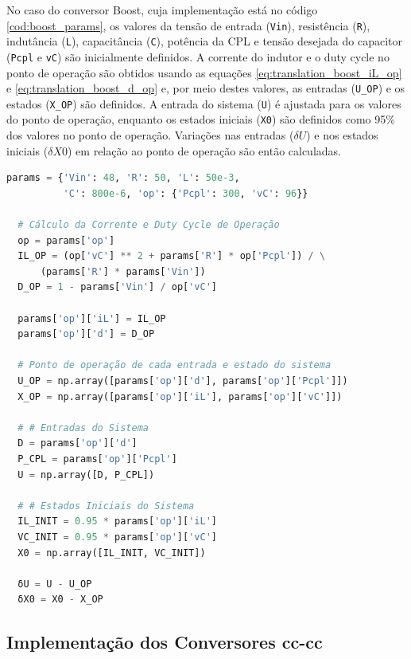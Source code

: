 No caso do conversor Boost, cuja implementação está no código \ref{cod:boost_params}, os valores da tensão de entrada (\texttt{Vin}), resistência (\texttt{R}), indutância (\texttt{L}), capacitância (\texttt{C}), potência da CPL e tensão desejada do capacitor (\texttt{Pcpl} e \texttt{vC}) são inicialmente definidos. A corrente do indutor e o duty cycle no ponto de operação são obtidos usando as equações \eqref{eq:translation_boost_iL_op} e \eqref{eq:translation_boost_d_op} e, por meio destes valores, as entradas (\texttt{U\_OP}) e os estados (\texttt{X\_OP}) são definidos. A entrada do sistema (\texttt{U}) é ajustada para os valores do ponto de operação, enquanto os estados iniciais (\texttt{X0}) são definidos como 95\% dos valores no ponto de operação. Variações nas entradas (\(\delta U\)) e nos estados iniciais ($\delta X0$) em relação ao ponto de operação são então calculadas.
\vspace{8pt}
\begin{lstlisting}[language=Python, caption={Parâmetros do conversor Boost.}, label=cod:boost_params]
  params = {'Vin': 48, 'R': 50, 'L': 50e-3,
          'C': 800e-6, 'op': {'Pcpl': 300, 'vC': 96}}

  # Cálculo da Corrente e Duty Cycle de Operação
  op = params['op']
  IL_OP = (op['vC'] ** 2 + params['R'] * op['Pcpl']) / \
      (params['R'] * params['Vin'])
  D_OP = 1 - params['Vin'] / op['vC']

  params['op']['iL'] = IL_OP
  params['op']['d'] = D_OP

  # Ponto de operação de cada entrada e estado do sistema
  U_OP = np.array([params['op']['d'], params['op']['Pcpl']])
  X_OP = np.array([params['op']['iL'], params['op']['vC']])

  # # Entradas do Sistema
  D = params['op']['d']
  P_CPL = params['op']['Pcpl']
  U = np.array([D, P_CPL])

  # # Estados Iniciais do Sistema
  IL_INIT = 0.95 * params['op']['iL']
  VC_INIT = 0.95 * params['op']['vC']
  X0 = np.array([IL_INIT, VC_INIT])

  δU = U - U_OP
  δX0 = X0 - X_OP
\end{lstlisting}

\subsection{Implementação dos Conversores \acrshort{cc}-\acrshort{cc}}

